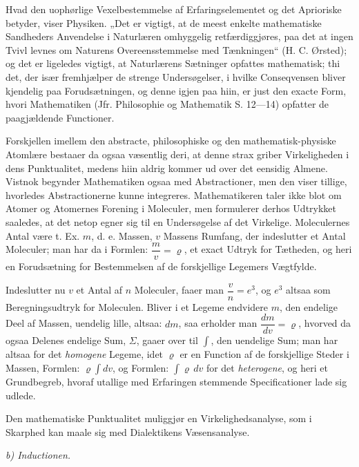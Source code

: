 \documentclass[12pt]{book}
\newcommand{\opage}[1]{\marginnote{\footnotesize\textit{[#1]}}}
\begin{document}
Hvad den uophørlige Vexelbestemmelse af Erfaringselementet og det Aprioriske betyder,
viser Physiken. „Det er vigtigt, at de meest enkelte mathematiske Sandheders
Anvendelse i Naturlæren omhyggelig retfærdiggjøres, paa det
\opage{55} at ingen Tvivl levnes om Naturens Overeensstemmelse med Tænkningen“ (H. C. Ørsted); og
det er ligeledes vigtigt, at Naturlærens Sætninger opfattes mathematisk; thi det, der
især fremhjælper de strenge Undersøgelser, i hvilke Conseqvensen bliver kjendelig paa
Forudsætningen, og denne igjen paa hiin, er just den exacte Form, hvori Mathematiken
(Jfr. Philosophie og Mathematik S. 12—14) opfatter de paagjældende Functioner.

Forskjellen imellem den abstracte, philosophiske og den mathematisk-physiske Atomlære
bestaaer da ogsaa væsentlig deri, at denne strax griber Virkeligheden i dens
Punktualitet, medens hiin aldrig kommer ud over det eensidig Almene. Vistnok begynder
Mathematiken ogsaa med Abstractioner, men den viser tillige, hvorledes Abstractionerne
kunne integreres. Mathematikeren taler ikke blot om Atomer og Atomernes Forening i
Moleculer, men formulerer derhos Udtrykket saaledes, at det netop egner sig til en
Undersøgelse af det Virkelige. Moleculernes Antal være t. Ex. $m$, d. e. Massen, $v$
Massens Rumfang, der indeslutter et Antal Moleculer; man har da i Formlen:
$\dfrac{m}{v} = \varrho$, et exact Udtryk for Tætheden, og heri en Forudsætning for
Bestemmelsen af de forskjellige Legemers Vægtfylde.

Indeslutter nu $v$ et Antal af $n$ Moleculer, faaer man $\dfrac{v}{n} = e^3$, og $e^3$
altsaa som Beregningsudtryk for Moleculen. Bliver i et Legeme endvidere $m$, den
endelige Deel af Massen, uendelig lille, altsaa: $dm$, saa erholder man
$\dfrac{dm}{dv} = \varrho$, hvorved da ogsaa Delenes endelige Sum, $\Sigma$, gaaer over
til $\int$, den uendelige Sum; man har altsaa for det \emph{homogene} Legeme, idet
$\varrho$ er en Function af de forskjellige Steder i Massen, Formlen: $\varrho\int dv$,
og Formlen: $\int \varrho\, dv$ for det \emph{heterogene},
\opage{56} og heri et Grundbegreb, hvoraf utallige med Erfaringen stemmende Specificationer lade
sig udlede.

Den mathematiske Punktualitet muliggjør en Virkelighedsanalyse, som i Skarphed kan
maale sig med Dialektikens Væsensanalyse.

\emph{b) Inductionen.}
\end{document}

